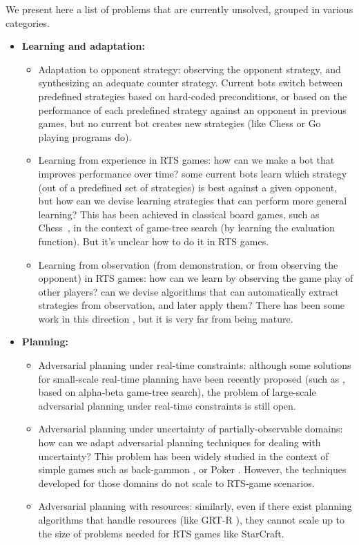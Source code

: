 \documentclass[journal]{IEEEtran}
\begin{document}
We present here a list of problems that are currently unsolved, grouped in various categories.

\begin{itemize}

\item {\bf Learning and adaptation:}
\begin{itemize}
\item Adaptation to opponent strategy: observing the opponent strategy, and synthesizing an adequate counter strategy. Current bots switch between predefined strategies based on hard-coded preconditions, or based on the performance of each predefined strategy against an opponent in previous games, but no current bot creates new strategies (like Chess or Go playing programs do).
\item Learning from experience in RTS games: how can we make a bot that improves performance over time? some current bots learn which strategy (out of a predefined set of strategies) is best against a given opponent, but how can we devise learning strategies that can perform more general learning? This has been achieved in classical board games, such as Chess~\cite{tesauro2001comparison}, in the context of game-tree search (by learning the evaluation function). But it's unclear how to do it in RTS games.
\item Learning from observation (from demonstration, or from observing the opponent) in RTS games: how can we learn by observing the game play of other players? can we devise algorithms that can automatically extract strategies from observation, and later apply them? There has been some work in this direction \cite{OntanonMSR10}, but it is very far from being mature.
\end{itemize}

\item {\bf Planning:}
\begin{itemize}
\item Adversarial planning under real-time constraints: although some solutions for small-scale real-time planning have been recently proposed (such as \cite{churchill2012AIIDE}, based on alpha-beta game-tree search), the problem of large-scale adversarial planning under real-time constraints is still open.
\item Adversarial planning under uncertainty of partially-observable domains: how can we adapt adversarial planning techniques for dealing with uncertainty? This problem has been widely studied in the context of simple games such as back-gammon \cite{tesauro1994td}, or Poker \cite{rubin2011computer}. However, the techniques developed for those domains do not scale to RTS-game scenarios.
\item Adversarial planning with resources: similarly, even if there exist planning algorithms that handle resources (like GRT-R \cite{refanidis2000heuristic}), they cannot scale up to the size of problems needed for RTS games like StarCraft.
\end{itemize}


\end{itemize}
\end{document}
